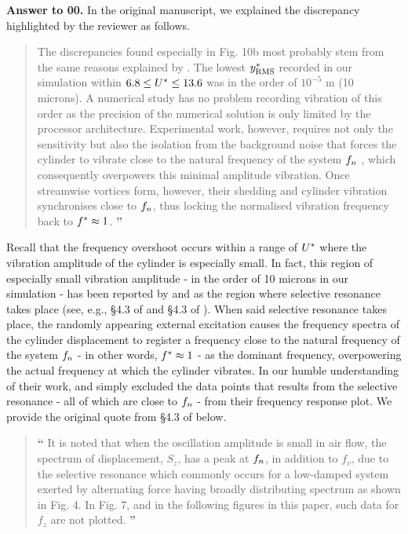 \documentclass[10pt]{article}
\newcounter{question}
\newcommand{\name}{00}
\newcommand{\answer}[1]{\noindent \textbf{Answer to \name.\thequestion}\vskip 0.25cm \noindent #1 \mbox{}\\}
\begin{document}
\answer{
  In the original manuscript, we explained the discrepancy highlighted by the reviewer as follows.

  \begin{quotation}
    \noindent {\Large \textbf{``}} The discrepancies found especially in Fig. 10b most probably stem from the same reasons explained by \citet{Nguyen2012}. The lowest  $y^{*}_{\text{RMS}}$ recorded in our simulation within  $6.8 \leq U^{*} \leq 13.6$ was in the order of $10^{-5}$ \si{\metre} (10 microns). A numerical study has no problem recording vibration of this order as the precision of the numerical solution is only limited by the processor architecture. Experimental work, however, requires not only the sensitivity but also the isolation from the background noise that forces the cylinder to vibrate close to the natural frequency of the system  $f_{n}$ \citep{Nguyen2012}, which consequently overpowers this minimal amplitude vibration. Once streamwise vortices form, however, their shedding and cylinder vibration synchronises close to $f_{n}$, thus locking the normalised vibration frequency back to  $f^{*} \approx 1$. {\Large \textbf{''}}
  \end{quotation}

  Recall that the frequency overshoot occurs within a range of $U^{*}$ where the vibration amplitude of the cylinder is especially small. In fact, this region of especially small vibration amplitude - in the order of 10 microns in our simulation - has been reported by \citet{Nguyen2012} and \citet{Nguyen2010} as the region where selective resonance takes place (see, e.g., \S4.3 of \citet{Nguyen2010} and \S4.3 of \citet{Nguyen2012}). When said selective resonance takes place, the randomly appearing external excitation causes the frequency spectra of the cylinder displacement to register a frequency close to the natural frequency of the system $f_{n}$ - in other words, $f^{*} \approx 1$ - as the dominant frequency, overpowering the actual frequency at which the cylinder vibrates. In our humble understanding of their work, \citet{Nguyen2010} and \citet{Nguyen2012} simply excluded the data points that results from the selective resonance - all of which are close to $f_{n}$ - from their frequency response plot. We provide the original quote from \S4.3 of \citet{Nguyen2012} below.

  \begin{quotation}
    {\Large \textbf{``}} It is noted that when the oscillation amplitude is small in air flow, the spectrum of displacement, $S_{z}$, has a peak at $f_{n}$, in addition to $f_{v}$, due to the selective resonance which commonly occurs for a low-damped system exerted by alternating force having broadly distributing spectrum as shown in Fig. 4. In Fig. 7, and in the following figures in this paper, such data for $f_{z}$ are not plotted. {\Large \textbf{''}}
  \end{quotation}

}
\end{document}
